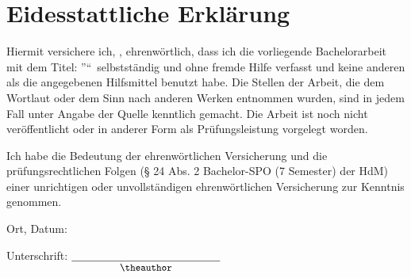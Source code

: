 \chapter*{Eidesstattliche Erklärung}

Hiermit versichere ich, \theauthor, ehrenwörtlich, dass ich die vorliegende Bachelorarbeit mit dem Titel: \textquotedblright\thetitle\textquotedblleft\ selbstständig und ohne fremde  Hilfe verfasst und keine anderen als die angegebenen Hilfsmittel benutzt habe. Die Stellen der Arbeit, die dem Wortlaut oder dem Sinn  nach anderen Werken entnommen wurden, sind in jedem Fall unter Angabe der Quelle kenntlich gemacht. Die Arbeit ist noch nicht veröffentlicht oder in anderer Form als Prüfungsleistung vorgelegt worden.


Ich habe die Bedeutung der ehrenwörtlichen Versicherung und die prüfungsrechtlichen Folgen (§ 24 Abs. 2 Bachelor-SPO (7 Semester) der HdM)  einer unrichtigen oder unvollständigen ehrenwörtlichen Versicherung zur Kenntnis genommen.

\bigskip\bigskip\bigskip
\noindent Ort, Datum: \underline{\hphantom{01.01.2020, Lüdenscheidt-West}}

\bigskip\bigskip\bigskip
\noindent Unterschrift: $\underset{\text{\small\theauthor}}{\underline{\hphantom{\text{01.01.2020, Lüdenscheidt-West}}}}$